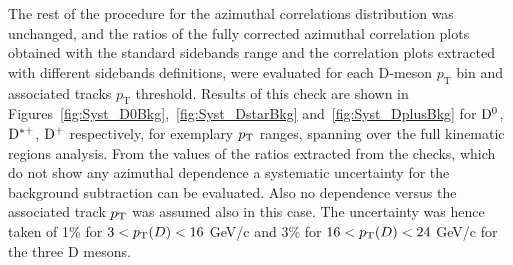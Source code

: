 The rest of the procedure for the azimuthal correlations distribution was unchanged, and the ratios of the fully corrected azimuthal correlation plots obtained with the standard sidebands range and the correlation plots extracted with different sidebands definitions, were evaluated for each D-meson $p_\text{T}$ bin and associated tracks $p_\text{T}$ threshold. Results of this check are shown in Figures~\ref{fig:Syst_D0Bkg},~\ref{fig:Syst_DstarBkg} and~\ref{fig:Syst_DplusBkg} for ${\rm D^0}$, ${\rm D^{*+}}$, ${\rm D^+}$ respectively, for exemplary $p_{\rm T}$ ranges, spanning over the full kinematic regions analysis. From the values of the ratios extracted from the checks, which do not show any azimuthal dependence a systematic uncertainty for the background subtraction can be evaluated. Also no dependence versus the associated track $p_{\rm T}$ was assumed also in this case. The uncertainty was hence taken of 1\% for $3 < p_{\rm T}(D) < 16$ GeV/c and 3\% for $16 < p_{\rm T}(D) < 24$ GeV/c for the three D mesons.

